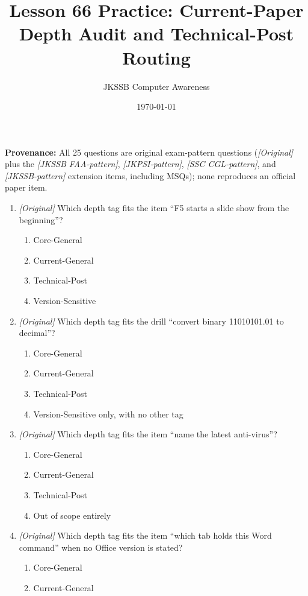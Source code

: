 \documentclass[11pt]{article}
\title{Lesson 66 Practice: Current-Paper Depth Audit and Technical-Post Routing}
\author{JKSSB Computer Awareness}
\date{\today}
\begin{document}
\maketitle
\noindent\textbf{Provenance:} All 25 questions are original exam-pattern questions (\textit{[Original]} plus the \textit{[JKSSB FAA-pattern]}, \textit{[JKPSI-pattern]}, \textit{[SSC CGL-pattern]}, and \textit{[JKSSB-pattern]} extension items, including MSQs); none reproduces an official paper item.

\begin{enumerate}[label=\textbf{Q\arabic*.}, leftmargin=*]
\item \textit{[Original]} Which depth tag fits the item ``F5 starts a slide show from the beginning''?
  \begin{enumerate}[label=\Alph*.]
    \item Core-General
    \item Current-General
    \item Technical-Post
    \item Version-Sensitive
  \end{enumerate}
\item \textit{[Original]} Which depth tag fits the drill ``convert binary 11010101.01 to decimal''?
  \begin{enumerate}[label=\Alph*.]
    \item Core-General
    \item Current-General
    \item Technical-Post
    \item Version-Sensitive only, with no other tag
  \end{enumerate}
\item \textit{[Original]} Which depth tag fits the item ``name the latest anti-virus''?
  \begin{enumerate}[label=\Alph*.]
    \item Core-General
    \item Current-General
    \item Technical-Post
    \item Out of scope entirely
  \end{enumerate}
\item \textit{[Original]} Which depth tag fits the item ``which tab holds this Word command'' when no Office version is stated?
  \begin{enumerate}[label=\Alph*.]
    \item Core-General
    \item Current-General

\end{enumerate}
\end{enumerate}
\end{document}
